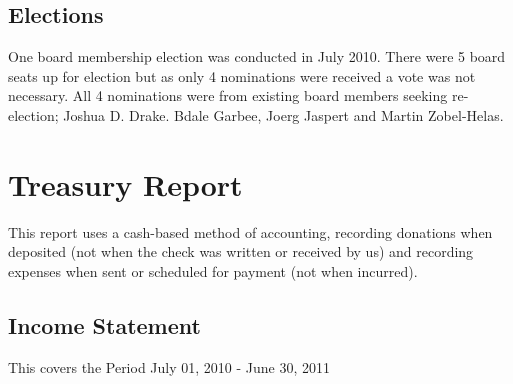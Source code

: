 \documentclass[letterpaper]{report}
\begin{document}
\section{Elections}

One board membership election was conducted in July 2010. There were 5 board
seats up for election but as only 4 nominations were received a vote was not
necessary. All 4 nominations were from existing board members seeking
re-election; Joshua D. Drake. Bdale Garbee, Joerg Jaspert and Martin
Zobel-Helas.

\chapter{Treasury Report}

This report uses a cash-based method of accounting, recording donations when
deposited (not when the check was written or received by us) and recording
expenses when sent or scheduled for payment (not when incurred).

\section{Income Statement}

This covers the Period July 01, 2010 - June 30, 2011
\end{document}
